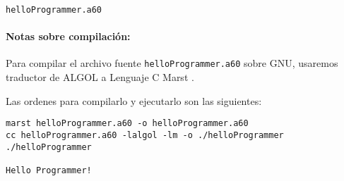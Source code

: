 %
%

\prog \texttt{helloProgrammer.a60}



\paragraph*{Notas sobre compilación:} Para compilar el archivo fuente
\texttt{helloProgrammer.a60} sobre GNU, usaremos traductor de ALGOL a Lenguaje C Marst . 

Las ordenes para compilarlo y ejecutarlo son las siguientes:

\begin{verbatim}
marst helloProgrammer.a60 -o helloProgrammer.a60
cc helloProgrammer.a60 -lalgol -lm -o ./helloProgrammer
./helloProgrammer

Hello Programmer!

\end{verbatim}

% 
% 
% 
% 
% 
% 
% 
% 
% 
% 
% 
% 
% 
% 
% 
% 

